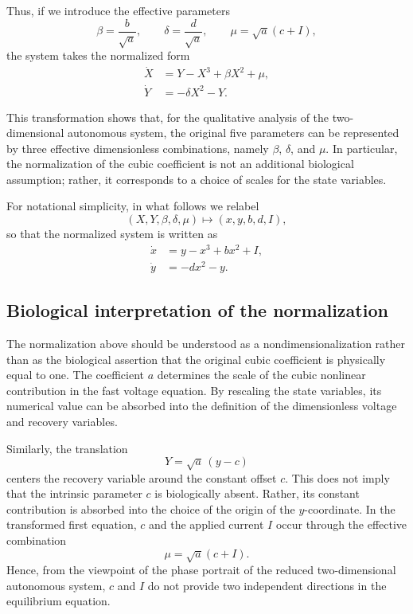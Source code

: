 \documentclass[11pt,a4paper]{article}
\begin{document}
Thus, if we introduce the effective parameters
\begin{equation}
\beta=\frac{b}{\sqrt{a}},
\qquad
\delta=\frac{d}{\sqrt{a}},
\qquad
\mu=\sqrt{a}(c+I),
\tag{5}
\end{equation}
the system takes the normalized form
\begin{equation}
\boxed{
\begin{aligned}
\dot{X}&=Y-X^3+\beta X^2+\mu,\\
\dot{Y}&=-\delta X^2-Y.
\end{aligned}}
\tag{6}
\end{equation}

This transformation shows that, for the qualitative analysis of the
two-dimensional autonomous system, the original five parameters can
be represented by three effective dimensionless combinations,
namely $\beta$, $\delta$, and $\mu$. In particular, the normalization
of the cubic coefficient is not an additional biological assumption;
rather, it corresponds to a choice of scales for the state variables.

For notational simplicity, in what follows we relabel
\[
(X,Y,\beta,\delta,\mu)
\longmapsto
(x,y,b,d,I),
\]
so that the normalized system is written as
\begin{equation}
\boxed{
\begin{aligned}
\dot{x}&=y-x^3+b x^2+I,\\
\dot{y}&=-d x^2-y.
\end{aligned}}
\tag{7}
\end{equation}

\subsection{Biological interpretation of the normalization}

The normalization above should be understood as a
nondimensionalization rather than as the biological assertion that
the original cubic coefficient is physically equal to one. The
coefficient $a$ determines the scale of the cubic nonlinear
contribution in the fast voltage equation. By rescaling the state
variables, its numerical value can be absorbed into the definition
of the dimensionless voltage and recovery variables.

Similarly, the translation
\begin{equation}
Y=\sqrt{a}\,(y-c)
\end{equation}
centers the recovery variable around the constant offset $c$. This
does not imply that the intrinsic parameter $c$ is biologically
absent. Rather, its constant contribution is absorbed into the choice
of the origin of the $y$-coordinate. In the transformed first
equation, $c$ and the applied current $I$ occur through the effective
combination
\begin{equation}
\mu=\sqrt{a}(c+I).
\end{equation}
Hence, from the viewpoint of the phase portrait of the reduced
two-dimensional autonomous system, $c$ and $I$ do not provide two
independent directions in the equilibrium equation.
\end{document}

